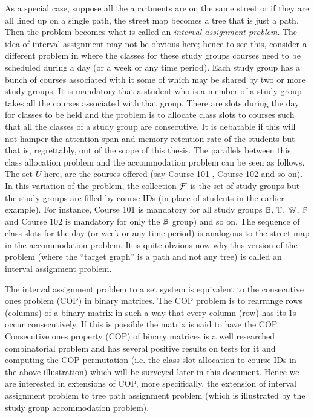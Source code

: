 \documentclass[MS,synopsis]{iitmdiss}
\begin{document}
As a special case, suppose all the apartments are on the same street
or if they are all lined up on a single path, the street map becomes a
tree that is just a path. Then the problem becomes what is called an
{\em interval assignment problem}. The idea of interval assignment may
not be obvious here; hence to see this, consider a different problem
in {\WSI} where the classes for these study groups courses need to be
scheduled during a day (or a week or any time period). Each study
group has a bunch of courses associated with it some of which may be
shared by two or more study groups. It is mandatory that a student who
is a member of a study group takes all the courses associated with
that group. There are slots during the day for classes to be held and
the problem is to allocate class slots to courses such that all the
classes of a study group are consecutive. It is debatable if this will
not hamper the attention span and memory retention rate of the
students but that is, regrettably, out of the scope of this
thesis. The parallels between this class allocation problem and the
accommodation problem can be seen as follows. The set $U$ here, are
the courses offered (say Course 101 {\coneohone}, Course 102
{\coneohtwo} and so on). In this variation of the problem, the
collection ${\cal F}$ is the set of study groups but the study groups are
filled by course IDs (in place of students in the earlier
example). For instance, Course 101 is mandatory for all study groups
$\mathbb{B}$, $\mathbb{T}$, $\mathbb{W}$, $\mathbb{F}$ and Course 102 is mandatory for
only the $\mathbb{B}$ group) and so on. The sequence of class slots for the
day (or week or any time period) is analogous to the street map in the
accommodation problem. It is quite obvious now why this version of the
problem (where the ``target graph'' is a path and not any
tree) is called an interval assignment
problem.

The interval assignment problem to a set system is equivalent to the
consecutive ones problem (COP) in binary matrices\cite{wlh02,
  nsnrs09}.  The COP problem is to rearrange rows (columns) of a
binary matrix in such a way that every column (row) has its $1$s occur
consecutively. If this is possible the matrix is said to have the COP.
Consecutive ones property (COP) of binary matrices is a well
researched combinatorial problem and has several positive results on
tests for it and computing the COP permutation (i.e. the class slot
allocation to course IDs in the above illustration) which will be
surveyed later in this document. Hence we are interested in extensions
of COP, more specifically, the extension of interval assignment
problem to tree path assignment problem (which is illustrated by the
study group accommodation problem).
\end{document}
